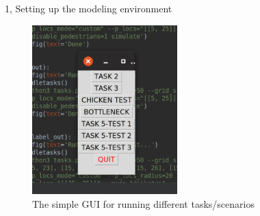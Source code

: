 \documentclass[10pt,a4paper]{article}
\begin{document}
\begin{task}{1, Setting up the modeling environment}
\begin{figure}[H]
    \centering
    \includegraphics[width=0.5\textwidth]{pictures/gui.png}
    \caption{The simple GUI for running different tasks/scenarios}
    \label{fig:gui}
\end{figure}

\end{task}
\end{document}
